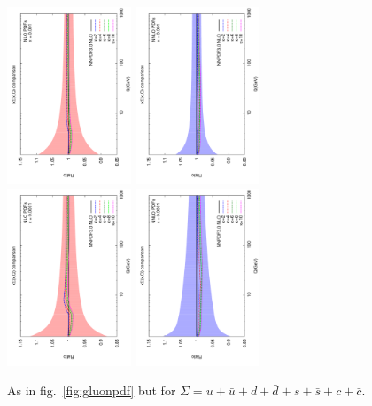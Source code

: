 \documentclass[letter,11pt]{article}
\begin{document}
\begin{figure}[h]
\includegraphics[width=0.33\textwidth,angle=-90]{./singlet_ratio_kb_nlo_x_0001.pdf}
\includegraphics[width=0.33\textwidth,angle=-90]{./singlet_ratio_kb_nnlo_x_0001.pdf}
\includegraphics[width=0.33\textwidth,angle=-90]{./singlet_ratio_kb_nlo_x_00001.pdf}
\includegraphics[width=0.33\textwidth,angle=-90]{./singlet_ratio_kb_nnlo_x_00001.pdf}
\caption{As in fig.~\ref{fig:gluonpdf} but for $\Sigma=u+\bar{u}+d+\bar{d}+s+\bar{s}+c+\bar{c}$.}
\label{fig:singlet}
\end{figure}
\end{document}
